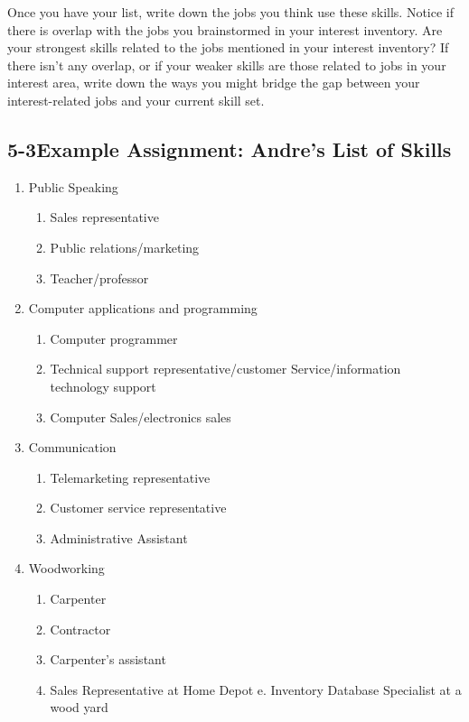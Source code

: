 Once you have your list, write down the jobs you think use these skills. Notice if there is overlap with the jobs you brainstormed in your interest inventory. Are your strongest skills related to the jobs mentioned in your interest inventory? If there isn't any overlap, or if your weaker skills are those related to jobs in your interest area, write down the ways you might bridge the gap between your interest-related jobs and your current skill set.
\pagebreak \subsection*{5-3\quad Example Assignment: Andre's List of Skills}
\begin{enumerate}[leftmargin=1cm]
	\item Public Speaking
	      \begin{enumerate}
		      \item Sales representative
		      \item Public relations/marketing
		      \item Teacher/professor
	      \end{enumerate}
	\item Computer applications and programming
	      \begin{enumerate}
		      \item Computer programmer
		      \item Technical  support representative/customer Service/information technology support
		      \item Computer Sales/electronics sales
	      \end{enumerate}
	\item Communication
	      \begin{enumerate}
		      \item Telemarketing representative
		      \item Customer service representative
		      \item Administrative Assistant
	      \end{enumerate}
	\item Woodworking
	      \begin{enumerate}
		      \item Carpenter
		      \item Contractor
		      \item Carpenter's assistant
		      \item Sales Representative at Home Depot e. Inventory Database Specialist at a wood yard

\end{enumerate}
\end{enumerate}
